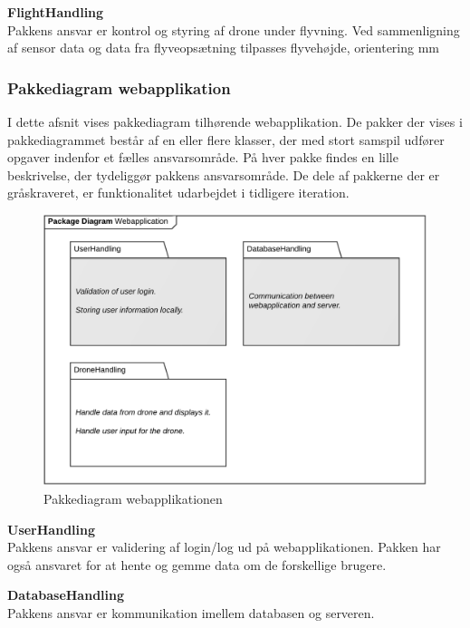\textbf{FlightHandling}\\
Pakkens ansvar er kontrol og styring af drone under flyvning. Ved sammenligning af sensor data og data fra flyveopsætning tilpasses flyvehøjde, orientering mm



\newpage
\subsubsection*{Pakkediagram webapplikation}

I dette afsnit vises pakkediagram tilhørende webapplikation. De pakker der vises i pakkediagrammet består af en eller flere klasser, der med stort samspil udfører opgaver indenfor et fælles ansvarsområde. På hver pakke findes en lille beskrivelse, der tydeliggør pakkens ansvarsområde. De dele af pakkerne der er gråskraveret, er funktionalitet udarbejdet i tidligere iteration.

\begin{figure}[H]
	\centering
	\includegraphics[width=1\textwidth]{Billeder/pakke_diagrammer/iteration2_server.png}
	\vspace{-0.5cm}
	\caption{Pakkediagram webapplikationen}
	\label{fig:iteration1_pakke_diagram_webapp}
\end{figure}

\textbf{UserHandling}\\
Pakkens ansvar er validering af login/log ud på webapplikationen. Pakken har også ansvaret for at hente og gemme data om de forskellige brugere.

\textbf{DatabaseHandling}\\
Pakkens ansvar er kommunikation imellem databasen og serveren. 

